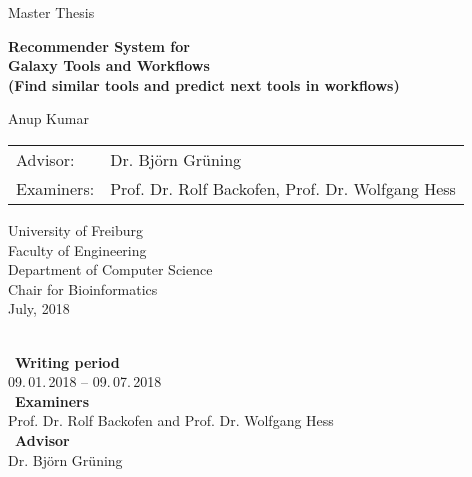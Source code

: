 \begin{titlepage}
\begin{center}

\newcommand{\HorizontalLine}{\rule{\linewidth}{0.3mm}}

{\Large Master Thesis}\\[2cm]


% 
\begin{spacing}{3}
    {\huge \bfseries Recommender System for } \\
    {\huge \bfseries Galaxy Tools and Workflows } \\
    {\Large \bfseries (Find similar tools and predict next tools in workflows) }\\[2cm]
\end{spacing}


{\Large Anup Kumar } \\[2cm]


\begin{tabular}[hc]{>{\Large}l >{\Large}l}
  Advisor: & Dr. Björn Grüning \\[0.3cm]
  Examiners: & Prof. Dr. Rolf Backofen, Prof. Dr. Wolfgang Hess \\[1.2cm]
\end{tabular}
\vfill  %

\Large {
    University of Freiburg\\
    Faculty of Engineering\\
    Department of Computer Science\\
    Chair for Bioinformatics\\[1cm]
    July, 2018
    \\
}
\end{center}
\end{titlepage}

\ \vfill \ \\  %
\
\textbf{Writing period}            \smallskip{} \\
09.\,01.\,2018 -- 09.\,07.\,2018   \bigskip{} \\
\
\textbf{Examiners}                 \smallskip{} \\
Prof. Dr. Rolf Backofen and Prof. Dr. Wolfgang Hess               \bigskip{} \\
\
\textbf{Advisor}                   \smallskip{} \\
Dr. Björn Grüning
